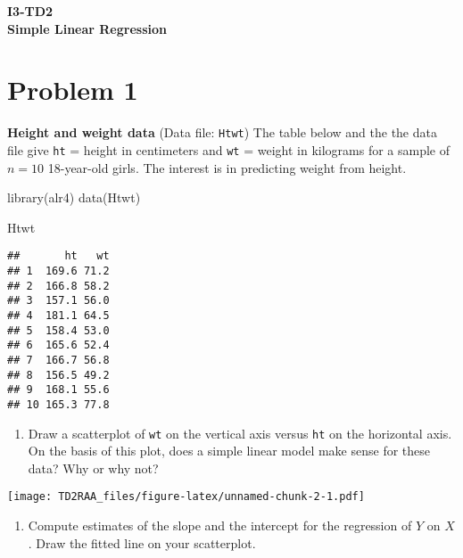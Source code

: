 \documentclass[
]{article}
\author{}
\date{\vspace{-2.5em}}
\newenvironment{Shaded}{\begin{snugshade}}{\end{snugshade}}
\newcommand{\FunctionTok}[1]{\textcolor[rgb]{0.00,0.00,0.00}{#1}}
\newcommand{\NormalTok}[1]{#1}
\newcommand{\SpecialCharTok}[1]{\textcolor[rgb]{0.00,0.00,0.00}{#1}}
\providecommand{\tightlist}{%
  \setlength{\itemsep}{0pt}\setlength{\parskip}{0pt}}
\begin{document}
\begin{center}
\textbf{I3-TD2} \\
\textbf{Simple Linear Regression}
\end{center}

\hypertarget{problem-1}{%
\section{Problem 1}\label{problem-1}}

\textbf{Height and weight data} (Data file: \texttt{Htwt}) The table
below and the the data file give \texttt{ht} = height in centimeters and
\texttt{wt} = weight in kilograms for a sample of \(n=10\) 18-year-old
girls. The interest is in predicting weight from height.

\begin{Shaded}
\begin{Highlighting}[]
\FunctionTok{library}\NormalTok{(alr4)}
\FunctionTok{data}\NormalTok{(Htwt)}

\NormalTok{Htwt}
\end{Highlighting}
\end{Shaded}

\begin{verbatim}
##       ht   wt
## 1  169.6 71.2
## 2  166.8 58.2
## 3  157.1 56.0
## 4  181.1 64.5
## 5  158.4 53.0
## 6  165.6 52.4
## 7  166.7 56.8
## 8  156.5 49.2
## 9  168.1 55.6
## 10 165.3 77.8
\end{verbatim}

\begin{enumerate}
\def\labelenumi{\alph{enumi}.}
\tightlist
\item
  Draw a scatterplot of \texttt{wt} on the vertical axis versus
  \texttt{ht} on the horizontal axis. On the basis of this plot, does a
  simple linear model make sense for these data? Why or why not?
\end{enumerate}

\begin{Shaded}
\end{Shaded}

\texttt{[image: TD2RAA\_files/figure-latex/unnamed-chunk-2-1.pdf]}

\begin{enumerate}
\def\labelenumi{\alph{enumi}.}
\setcounter{enumi}{1}
\tightlist
\item
  Compute estimates of the slope and the intercept for the regression of
  \(Y\) on \(X\). Draw the fitted line on your scatterplot.
\end{enumerate}
\end{document}
